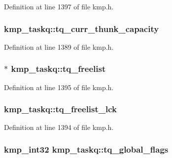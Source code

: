 Definition at line 1397 of file kmp.\-h.

\hypertarget{structkmp__taskq_a45ff2bfd58b826f09f523dd3d5d94ab3}{
\subsubsection[{tq\-\_\-curr\-\_\-thunk\-\_\-capacity}]{ kmp\-\_\-taskq\-::tq\-\_\-curr\-\_\-thunk\-\_\-capacity}}\label{structkmp__taskq_a45ff2bfd58b826f09f523dd3d5d94ab3}


Definition at line 1389 of file kmp.\-h.

\hypertarget{structkmp__taskq_ac7600293c9ae3cc94e5228d1c6e53733}{
\subsubsection[{tq\-\_\-freelist}]{$\ast$ kmp\-\_\-taskq\-::tq\-\_\-freelist}}\label{structkmp__taskq_ac7600293c9ae3cc94e5228d1c6e53733}


Definition at line 1395 of file kmp.\-h.

\hypertarget{structkmp__taskq_acf4e08b3b0ca30ca153287feb367a336}{
\subsubsection[{tq\-\_\-freelist\-\_\-lck}]{ kmp\-\_\-taskq\-::tq\-\_\-freelist\-\_\-lck}}\label{structkmp__taskq_acf4e08b3b0ca30ca153287feb367a336}


Definition at line 1394 of file kmp.\-h.

\hypertarget{structkmp__taskq_a3fcec7effcbdd186e9d731640c643858}{
\subsubsection[{tq\-\_\-global\-\_\-flags}]{\setlength{\rightskip}{0pt plus 5cm}kmp\-\_\-int32 kmp\-\_\-taskq\-::tq\-\_\-global\-\_\-flags}}\label{structkmp__taskq_a3fcec7effcbdd186e9d731640c643858}


